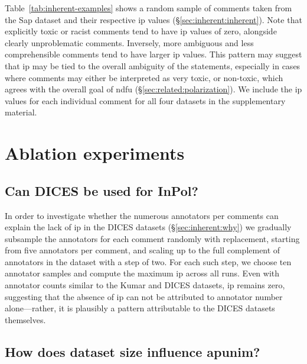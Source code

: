 \documentclass{article} %
\theoremstyle{definition}
\theoremstyle{plain}
\begin{document}
Table~\ref{tab:inherent-examples} shows a random sample of comments taken from the Sap dataset and their respective \ac{ip} values (\S\ref{sec:inherent:inherent}). Note that explicitly toxic or racist comments tend to have \ac{ip} values of zero, alongside clearly unproblematic comments. Inversely, more ambiguous and less comprehensible comments tend to have larger \ac{ip} values. This pattern may suggest that \ac{ip} may be tied to the overall ambiguity of the statements, especially in cases where comments may either be interpreted as very toxic, or non-toxic, which agrees with the overall goal of \ac{ndfu} (\S\ref{sec:related:polarization}).
We include the \ac{ip} values for each individual comment for all four datasets in the supplementary material.


\section{Ablation experiments}
\label{app:ablation}

\subsection{Can DICES be used for InPol?}
\label{app:ablation:dices}

In order to investigate whether the numerous annotators per comments can explain the lack of \ac{ip} in the DICES datasets (\S\ref{sec:inherent:why}) we gradually subsample the annotators for each comment randomly with replacement, starting from five annotators per comment, and scaling up to the full complement of annotators in the dataset with a step of two. For each such step, we choose ten annotator samples and compute the maximum \ac{ip} across all runs. Even with annotator counts similar to the Kumar and DICES datasets, \ac{ip} remains zero, suggesting that the absence of \ac{ip} can not be attributed to annotator number alone---rather, it is plausibly a pattern attributable to the DICES datasets themselves. 


\subsection{How does dataset size influence apunim?}
\label{app:ablation:sample-size}
\end{document}
